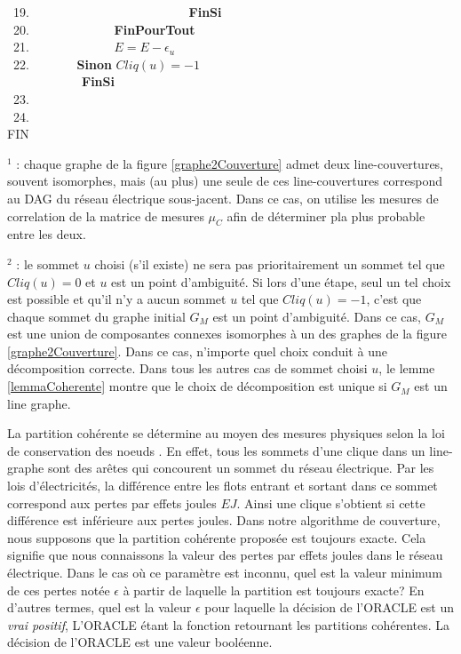 \begin{algorithm}[!ht]
~19. 	\indent~~~~~~~~~~~~~~~~~~~~~~~~~{\bf FinSi} \\
~20.		\indent ~~~~~~~~~~~~~{\bf FinPourTout}\\
~21.		\indent ~~~~~~~~~~~~~$E = E - \epsilon_u$\\
~22.		\indent            ~~~~~~~{\bf Sinon} $Cliq(u) = -1$\\
	       	\indent~~~~~~~~~~~~{\bf FinSi}\\
~23. \\
~24. \\
\noindent FIN\\
\end{algorithm}

\FloatBarrier
$^1$ : chaque graphe de la figure \ref{graphe2Couverture} admet deux line-couvertures, souvent isomorphes, mais (au plus) une seule de ces line-couvertures correspond au DAG du r\'eseau \'electrique sous-jacent. Dans ce cas, on utilise les mesures de correlation de la matrice de mesures $\mu_C$ afin de d\'eterminer pla plus probable entre les deux.
\newline

 $^2$ :  le sommet $u$ choisi (s'il existe) ne sera pas prioritairement un sommet tel que $Cliq(u) = 0$ et $u$ est un point d'ambiguit\'e. Si lors d'une \'etape, seul un tel choix est possible et qu'il n'y a aucun sommet $u$ tel que $Cliq(u) = -1$, c'est que chaque sommet du graphe initial $G_M$ est un point d'ambiguit\'e.
 Dans ce cas, $G_M$ est une union de composantes connexes isomorphes \`a un des graphes de la figure  \ref{graphe2Couverture}.
Dans ce cas, n'importe quel choix conduit \`a une d\'ecomposition correcte.
Dans tous les autres cas de sommet choisi $u$, le lemme \ref{lemmaCoherente} montre que le choix de d\'ecomposition est unique si $G_M$ est un line graphe.
\newline

La partition coh\'erente se d\'etermine au moyen des mesures physiques selon la loi de conservation des noeuds \cite{loiDeConservation}. 
En effet, tous les sommets d'une clique dans un line-graphe sont des ar\^etes qui concourent un sommet du r\'eseau \'electrique. 
Par les lois d'\'electricit\'es, la diff\'erence entre les flots entrant et sortant dans ce sommet correspond aux pertes par effets joules $EJ$. 
Ainsi une clique s'obtient si cette diff\'erence est inf\'erieure aux pertes joules.
Dans notre algorithme de couverture, nous supposons que la partition coh\'erente propos\'ee est toujours exacte. Cela signifie que nous connaissons la valeur des pertes par effets joules dans le r\'eseau \'electrique. Dans le cas o\`u ce param\`etre est inconnu, quel est la valeur minimum de ces pertes not\'ee $\epsilon$ \`a partir de laquelle la partition est toujours exacte?
En d'autres termes, quel est la valeur $\epsilon$ pour laquelle la d\'ecision de l'ORACLE est un {\em vrai positif}, L'ORACLE \'etant la fonction retournant les partitions coh\'erentes. 
La d\'ecision de l'ORACLE est une valeur bool\'eenne.


